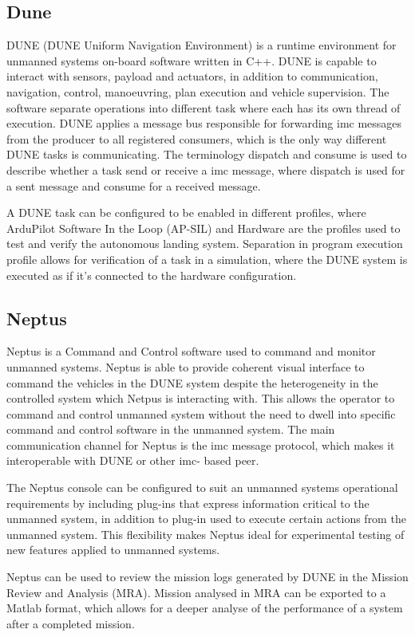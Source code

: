\subsection{Dune}
DUNE (DUNE Uniform Navigation Environment) is a runtime environment for unmanned systems on-board software written in C++. DUNE is capable to interact with sensors, payload and actuators, in addition to communication, navigation, control, manoeuvring, plan execution and vehicle supervision. The software separate operations into different task where each has its own thread of execution. DUNE applies a message bus responsible for forwarding \gls{imc} messages from the producer to all registered consumers, which is the only way different DUNE tasks is communicating. The terminology dispatch and consume is used to describe whether a task send or receive a \gls{imc} message, where dispatch is used for a sent message and consume for a received message. 

A DUNE task can be configured to be enabled in different profiles, where ArduPilot Software In the Loop (AP-SIL) and Hardware are the profiles used to test and verify the autonomous landing system. Separation in program execution profile allows for verification of a task in a simulation, where the DUNE system is executed as if it's connected to the hardware configuration.
 
\subsection{Neptus}
Neptus is a Command and Control software used to command and monitor unmanned systems. Neptus is able to provide coherent visual interface to command the vehicles in the DUNE system despite the heterogeneity in the controlled system which Netpus is interacting with. This allows the operator to command and control unmanned system without the need to dwell into specific command and control software in the unmanned system. The main communication channel for Neptus is the \gls{imc} message protocol, which makes it interoperable with DUNE or other \gls{imc}- based peer.

The Neptus console can be configured to suit an unmanned systems operational requirements by including plug-ins that express information critical to the unmanned system, in addition to plug-in used to execute certain actions from the unmanned system. This flexibility makes Neptus ideal for experimental testing of new features  applied to unmanned systems.   

Neptus can be used to review the mission logs generated by DUNE in the Mission Review and Analysis (MRA). Mission analysed in MRA can be exported to a Matlab format, which allows for a deeper analyse of the performance of a system after a completed mission.
